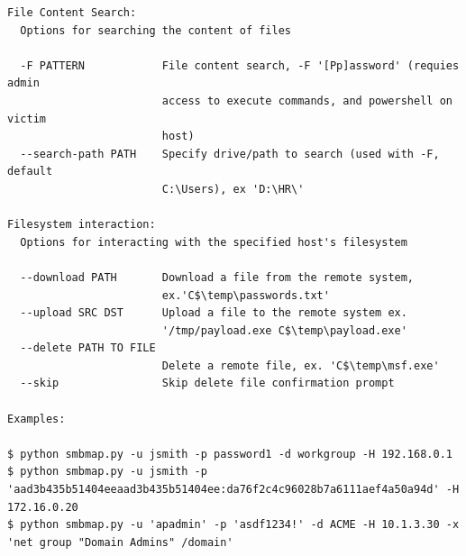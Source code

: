 \documentclass{article}
\begin{document}
\begin{lstlisting}
File Content Search:
  Options for searching the content of files

  -F PATTERN            File content search, -F '[Pp]assword' (requies admin
                        access to execute commands, and powershell on victim
                        host)
  --search-path PATH    Specify drive/path to search (used with -F, default
                        C:\Users), ex 'D:\HR\'

Filesystem interaction:
  Options for interacting with the specified host's filesystem

  --download PATH       Download a file from the remote system,
                        ex.'C$\temp\passwords.txt'
  --upload SRC DST      Upload a file to the remote system ex.
                        '/tmp/payload.exe C$\temp\payload.exe'
  --delete PATH TO FILE
                        Delete a remote file, ex. 'C$\temp\msf.exe'
  --skip                Skip delete file confirmation prompt

Examples:

$ python smbmap.py -u jsmith -p password1 -d workgroup -H 192.168.0.1
$ python smbmap.py -u jsmith -p 'aad3b435b51404eeaad3b435b51404ee:da76f2c4c96028b7a6111aef4a50a94d' -H 172.16.0.20
$ python smbmap.py -u 'apadmin' -p 'asdf1234!' -d ACME -H 10.1.3.30 -x 'net group "Domain Admins" /domain'
\end{lstlisting}
\end{document}
